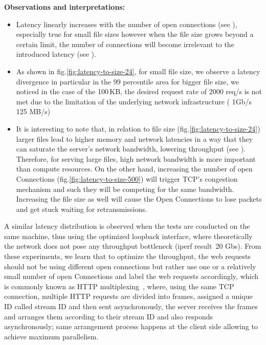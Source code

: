 \documentclass[runningheads]{llncs}
\begin{document}
\textbf{Observations and interpretations:}
\begin{itemize}
  \item Latency linearly increases with the number of open connections (see ), especially true for small file sizes however when the file size grows beyond a certain limit, the number of connections will become irrelevant to the introduced latency (see ). 
  \item As shown in fig.\ref{fig:latency-to-size-24}, for small file size, we observe a latency divergence in particular in the 99 percentile area
for bigger file size, we noticed in the case of the 100\,KB, the desired request rate of 2000 req/s is not met due to the limitation of the underlying network infrastructure ( 1Gb/s ~ 125 MB/s)
  \item It is interesting to note that, in relation to file size (fig.\ref{fig:latency-to-size-24}) larger files lead to higher memory and network latencies in a way that they can saturate the server’s network bandwidth, lowering throughput (see ). Therefore,  for  serving  large files,  high  network  bandwidth  is  more  important  than compute resources. On the other hand, increasing the number of open Connections (fig.\ref{fig:latency-to-size-500}) will trigger TCP's congestion mechanism and such they will be competing for the same bandwidth. Increasing the file size as well will cause the Open Connections to lose packets and get stuck waiting for retransmissions.
\end{itemize}
A similar latency distribution is observed when the tests are conducted on the same machine, thus using the optimized\cite{linuxkernelcommit} loopback interface, where theoretically the network does not pose any throughput bottleneck (iperf \cite{iperf} result~20 Gbs).
From these experiments, we learn that to optimize the throughput, the web requests should not be using different open connections but rather use one or a relatively small number of open Connections and label the web requests accordingly, which is commonly known as HTTP multiplexing \,\cite{SMUX}, where, using the same TCP connection, multiple HTTP requests are divided into frames, assigned a unique ID called stream ID and then sent asynchronously, the server receives the frames and arranges them according to their stream ID and also responds asynchronously; same arrangement process happens at the client side allowing to achieve maximum parallelism.
\end{document}

